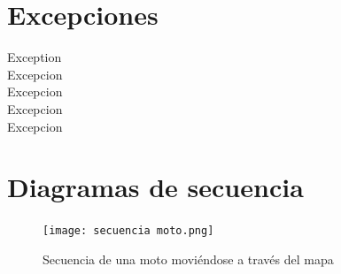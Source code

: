 \documentclass[titlepage,a4paper]{article}
\begin{document}
    \section{Excepciones}\label{sec:excepciones}

    \begin{description}
        \item[Exception]
        \item[Excepcion]
        \item[Excepcion]
        \item[Excepcion]
        \item[Excepcion]
    \end{description}

    \section{Diagramas de secuencia}\label{sec:diagramasdesecuencia}



    \begin{figure}[H]
        \centering
        \texttt{[image: secuencia moto.png]}
        \caption{\label{fig:seq01}Secuencia de una moto moviéndose a través del mapa}
    \end{figure}
\end{document}
